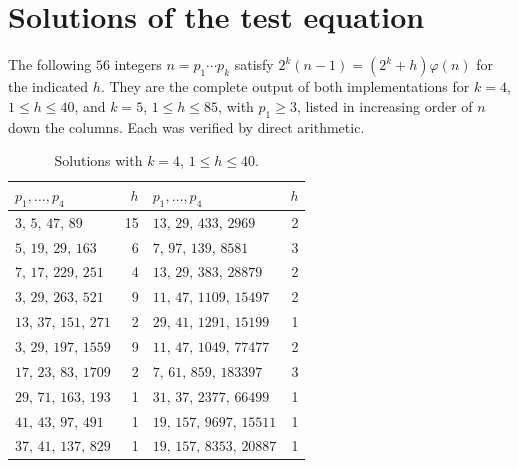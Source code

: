 \documentclass[screen,reqno]{aomart}
\numberwithin{equation}{section}
\theoremstyle{plain}
\theoremstyle{definition}
\theoremstyle{remark}
\begin{document}
\appendix
\section{Solutions of the test equation}\label{app:tests}

The following $56$ integers $n=p_1\cdots p_k$ satisfy
$2^k(n-1)=(2^k+h)\varphi(n)$ for the indicated $h$. They are the
complete output of both implementations for $k=4$, $1\le h\le40$, and
$k=5$, $1\le h\le85$, with $p_1\ge3$, listed in increasing order of
$n$ down the columns. Each was verified by direct arithmetic.

\begin{table}[ht]
\centering
\caption{Solutions with $k=4$, $1\le h\le40$.}
\label{tab:S4}
\smallskip
\footnotesize
\begin{tabular}{@{}lr@{\qquad}lr@{}}
\toprule
$p_1,\dots,p_4$ & $h$ & $p_1,\dots,p_4$ & $h$ \\
\midrule
$3,\,5,\,47,\,89$ & 15 & $13,\,29,\,433,\,2969$ & 2 \\
$5,\,19,\,29,\,163$ & 6 & $7,\,97,\,139,\,8581$ & 3 \\
$7,\,17,\,229,\,251$ & 4 & $13,\,29,\,383,\,28879$ & 2 \\
$3,\,29,\,263,\,521$ & 9 & $11,\,47,\,1109,\,15497$ & 2 \\
$13,\,37,\,151,\,271$ & 2 & $29,\,41,\,1291,\,15199$ & 1 \\
$3,\,29,\,197,\,1559$ & 9 & $11,\,47,\,1049,\,77477$ & 2 \\
$17,\,23,\,83,\,1709$ & 2 & $7,\,61,\,859,\,183397$ & 3 \\
$29,\,71,\,163,\,193$ & 1 & $31,\,37,\,2377,\,66499$ & 1 \\
$41,\,43,\,97,\,491$ & 1 & $19,\,157,\,9697,\,15511$ & 1 \\
$37,\,41,\,137,\,829$ & 1 & $19,\,157,\,8353,\,20887$ & 1 \\
\bottomrule
\end{tabular}
\end{table}
\end{document}
